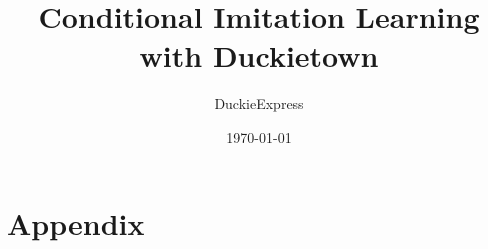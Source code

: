 \documentclass[a4paper,cleardoubleempty,BCOR1cm,oneside]{scrbook} %
\title{Conditional Imitation Learning with Duckietown}
\author{DuckieExpress}
\date{\today}
\begin{document}








 


% 

%

\newpage
\appendix
\chapter{Appendix}





\end{document}
